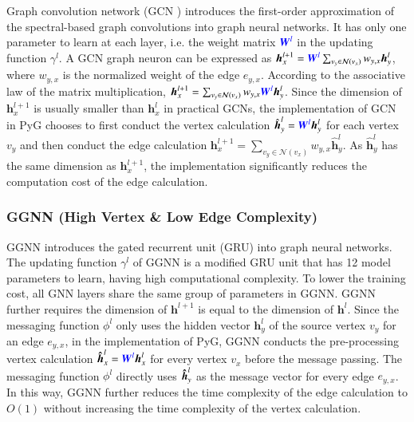 Graph convolution network (GCN \cite{kipf2017_gcn}) introduces the first-order approximation of the spectral-based graph convolutions into graph neural networks.
%
It has only one parameter to learn at each layer, i.e. the weight matrix $\textcolor{blue}{\boldsymbol{W}^l}$ in the updating function $\gamma^l$.
%
A GCN graph neuron can be expressed as $\boldsymbol{h}^{l+1}_x = \textcolor{blue}{\boldsymbol{W}^l}\sum_{v_y \in \mathcal{N}(v_x)}{w_{y,x}\boldsymbol{h}^l_y}$, where $w_{y,x}$ is the normalized weight of the edge $e_{y,x}$.
%
According to the associative law of the matrix multiplication, $\boldsymbol{h}^{l+1}_x = \sum_{v_y \in \mathcal{N}(v_x)}{w_{y,x}\textcolor{blue}{\boldsymbol{W}^l}\boldsymbol{h}^l_y}$.
%
Since the dimension of $\boldsymbol{h}^{l+1}_x$ is usually smaller than $\boldsymbol{h}^l_x$ in practical GCNs, the implementation of GCN in PyG chooses to first conduct the vertex calculation $\hat{\boldsymbol{h}}^l_y = \textcolor{blue}{\boldsymbol{W}^l}\boldsymbol{h}^l_y$ for each vertex $v_y$ and then conduct the edge calculation $\boldsymbol{h}^{l+1}_x=\sum_{v_y\in\mathcal{N}(v_x)}{w_{y,x}\hat{\boldsymbol{h}}^l_y}$.
%
As $\hat{\boldsymbol{h}}^l_y$ has the same dimension as $\boldsymbol{h}^{l+1}_x$, the implementation significantly reduces the  computation cost of the edge calculation.

\subsubsection{GGNN (High Vertex \& Low Edge Complexity)}

GGNN \cite{li2015_ggnn} introduces the gated recurrent unit (GRU) into graph neural networks.
%
The updating function $\gamma^l$ of GGNN is a modified GRU unit that has 12 model parameters to learn, having high computational complexity.
%
To lower the training cost, all GNN layers share the same group of parameters in GGNN.
%
GGNN further requires the dimension of $\boldsymbol{h}^{l+1}$ is equal to the dimension of $\boldsymbol{h}^l$.
%
Since the messaging function $\phi^l$ only uses the hidden vector $\boldsymbol{h}^l_y$ of the source vertex $v_y$ for an edge $e_{y,x}$, in the implementation of PyG, GGNN conducts the pre-processing vertex calculation $\boldsymbol{\hat{h}}^l_x = \textcolor{blue}{\boldsymbol{W}^l}\boldsymbol{h}^l_x$ for every vertex $v_x$ before the message passing.
%
The messaging function $\phi^l$ directly uses $\boldsymbol{\hat{h}}^l_y$ as the message vector for every edge $e_{y, x}$.
%
In this way, GGNN further reduces the time complexity of the edge calculation to $O(1)$ without increasing the time complexity of the vertex calculation.


